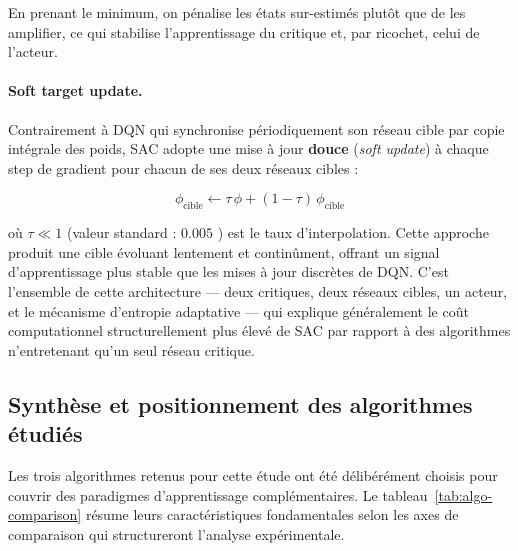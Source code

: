 En prenant le minimum, on pénalise les états sur-estimés plutôt que de les
amplifier, ce qui stabilise l'apprentissage du critique et, par ricochet,
celui de l'acteur.
 
\paragraph{Soft target update.}
Contrairement à DQN qui synchronise périodiquement son réseau cible par
copie intégrale des poids, SAC adopte une mise à jour \textbf{douce}
(\textit{soft update}) à chaque step de gradient pour chacun de ses deux
réseaux cibles :
 
\begin{equation}
    \phi_{\text{cible}} \leftarrow \tau\,\phi + (1-\tau)\,\phi_{\text{cible}}
\end{equation}
 
\noindent où $\tau \ll 1$ (valeur standard : $0.005$ \parencite{haarnojaSoftActorCriticOffPolicy2018}) est le taux
d'interpolation. Cette approche produit une cible évoluant lentement et
continûment, offrant un signal d'apprentissage plus stable que les mises
à jour discrètes de DQN. C'est l'ensemble de cette architecture --- deux
critiques, deux réseaux cibles, un acteur, et le mécanisme d'entropie
adaptative --- qui explique généralement le coût computationnel structurellement plus élevé de SAC par rapport à des algorithmes n'entretenant qu'un seul réseau critique.


\subsection{Synthèse et positionnement des algorithmes étudiés}

Les trois algorithmes retenus pour cette étude ont été délibérément choisis pour couvrir des paradigmes d'apprentissage complémentaires. Le tableau~\ref{tab:algo-comparison} résume leurs caractéristiques fondamentales selon les axes de comparaison qui structureront l'analyse expérimentale.

